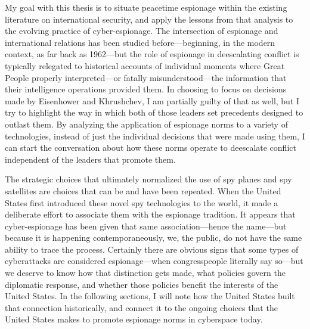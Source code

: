 \documentclass{memoir}
\begin{document}
My goal with this thesis is to situate peacetime espionage within the existing literature on international security, and apply the lessons from that analysis to the evolving practice of cyber-espionage. The intersection of espionage and international relations has been studied before---beginning, in the modern context, as far back as 1962---but the role of espionage in deescalating conflict is typically relegated to historical accounts of individual moments where Great People properly interpreted---or fatally misunderstood---the information that their intelligence operations provided them. In choosing to focus on decisions made by Eisenhower and Khrushchev, I am partially guilty of that as well, but I try to highlight the way in which both of those leaders set precedents designed to outlast them. By analyzing the application of espionage norms to a variety of technologies, instead of just the individual decisions that were made using them, I can start the conversation about how these norms operate to deescalate conflict independent of the leaders that promote them.

The strategic choices that ultimately normalized the use of spy planes and spy satellites are choices that can be and have been repeated. When the United States first introduced these novel spy technologies to the world, it made a deliberate effort to associate them with the espionage tradition. It appears that cyber-espionage has been given that same association---hence the name---but because it is happening contemporaneously, we, the public, do not have the same ability to trace the process. Certainly there are obvious signs that some types of cyberattacks are considered espionage---when congresspeople literally say so---but we deserve to know how that distinction gets made, what policies govern the diplomatic response, and whether those policies benefit the interests of the United States. In the following sections, I will note how the United States built that connection historically, and connect it to the ongoing choices that the United States makes to promote espionage norms in cyberspace today.
\end{document}
